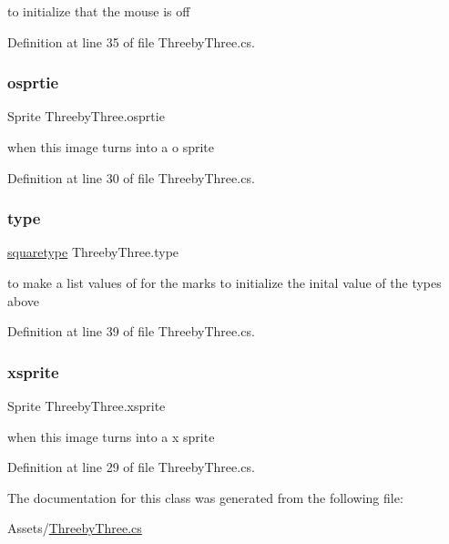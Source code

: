 to initialize that the mouse is off 

Definition at line 35 of file Threeby\+Three.\+cs.

\mbox{\label{class_threeby_three_ae4e4051c2fca5755d7fd8c72dfa8b398}} 
\subsubsection{\texorpdfstring{osprtie}{osprtie}}
{\footnotesize\ttfamily Sprite Threeby\+Three.\+osprtie}

when this image turns into a o sprite 

Definition at line 30 of file Threeby\+Three.\+cs.

\mbox{\label{class_threeby_three_a579689ce52e962f45fd71e0f6aa6afa0}} 
\subsubsection{\texorpdfstring{type}{type}}
{\footnotesize\ttfamily \mbox{\hyperlink{class_threeby_three_acef42f3cc5d8ffa948e5f800edb7a407}{squaretype}} Threeby\+Three.\+type}

to make a list values of for the marks to initialize the inital value of the types above 

Definition at line 39 of file Threeby\+Three.\+cs.

\mbox{\label{class_threeby_three_a8539275ae4e453b0c2b49aa0063fef7c}} 
\subsubsection{\texorpdfstring{xsprite}{xsprite}}
{\footnotesize\ttfamily Sprite Threeby\+Three.\+xsprite}

when this image turns into a x sprite 

Definition at line 29 of file Threeby\+Three.\+cs.



The documentation for this class was generated from the following file\+:\begin{DoxyCompactItemize}
\item 
Assets/\mbox{\hyperlink{_threeby_three_8cs}{Threeby\+Three.\+cs}}\end{DoxyCompactItemize}
